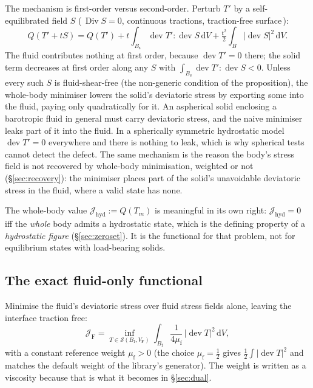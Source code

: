 \documentclass[11pt]{article}
\newcommand{\Jf}{\mathscr{J}}  %
\newcommand{\Bs}{B_{\mathrm{s}}}
\newcommand{\Bf}{B_{\mathrm{f}}}
\newcommand{\dV}{\,\mathrm{d}V}
\newcommand{\dev}{\operatorname{dev}}
\newcommand{\Div}{\operatorname{Div}}
\newcommand{\JF}{\Jf _{\mathrm{F}}}
\newcommand{\Jh}{\Jf _{\mathrm{hyd}}}
\begin{document}
The mechanism is first-order versus second-order. Perturb $T'$ by a
self-equilibrated field $S$ (\,$\Div S = 0$, continuous tractions,
traction-free surface\,):
\begin{equation}
  Q(T' + tS) = Q(T')
  + t\int_{\Bs}\dev T' : \dev S \dV
  + \tfrac{t^{2}}{2}\int_{B}|\dev S|^{2}\dV .
\end{equation}
The fluid contributes nothing at first order, because $\dev T' = 0$
there; the solid term decreases at first order along any $S$ with
$\int_{\Bs}\dev T':\dev S < 0$. Unless every such $S$ is fluid-shear-free
(the non-generic condition of the proposition), the whole-body minimiser
lowers the solid's deviatoric stress by exporting some into the fluid,
paying only quadratically for it. An aspherical solid enclosing a
barotropic fluid in general must carry deviatoric stress, and the
naive minimiser leaks part of it into the fluid. In a spherically
symmetric hydrostatic model $\dev T' = 0$ everywhere and there is
nothing to leak, which is why spherical tests cannot detect the defect.
The same mechanism is the reason the body's stress field is not
recovered by whole-body minimisation, weighted or not
(\S\ref{sec:recovery}): the minimiser places part of the solid's
unavoidable deviatoric stress in the fluid, where a valid state has
none.

The whole-body value $\Jh := Q(T_m)$ is meaningful in its own right:
$\Jh = 0$ iff the \emph{whole} body admits a hydrostatic state, which is
the defining property of a \emph{hydrostatic figure}
(\S\ref{sec:zeroset}). It is the functional for that problem, not for
equilibrium states with load-bearing solids.

\subsection{The exact fluid-only functional}
\label{sec:JF}

Minimise the fluid's deviatoric stress over fluid stress fields alone,
leaving the interface traction free:
\begin{equation}
  \JF = \inf_{T \in \mathcal{S}(\Bf, V_{\mathrm{F}})}
        \int_{\Bf}\frac{1}{4\mu_{\mathrm{f}}}\,|\dev T|^{2}\dV ,
  \label{eq:JF}
\end{equation}
with a constant reference weight $\mu_{\mathrm{f}} > 0$ (the choice
$\mu_{\mathrm{f}} = \tfrac12$ gives $\tfrac12\int|\dev T|^2$ and matches
the default weight of the library's generator). The weight is written
as a viscosity because that is what it becomes in \S\ref{sec:dual}.
\end{document}
